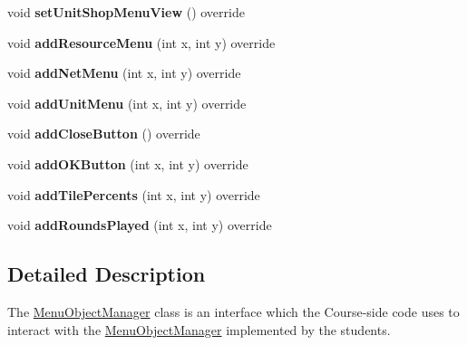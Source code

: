 \begin{DoxyCompactItemize}
\item 
\hypertarget{class_student_1_1_menu_object_manager_ae8347dca587be960c557aa66fada1ea8}{void {\bfseries set\-Unit\-Shop\-Menu\-View} () override}\label{class_student_1_1_menu_object_manager_ae8347dca587be960c557aa66fada1ea8}

\item 
\hypertarget{class_student_1_1_menu_object_manager_a5679ccf375ca620ce923a50ed22deff4}{void {\bfseries add\-Resource\-Menu} (int x, int y) override}\label{class_student_1_1_menu_object_manager_a5679ccf375ca620ce923a50ed22deff4}

\item 
\hypertarget{class_student_1_1_menu_object_manager_ab57240c9624c859f44e9ac26fc840e80}{void {\bfseries add\-Net\-Menu} (int x, int y) override}\label{class_student_1_1_menu_object_manager_ab57240c9624c859f44e9ac26fc840e80}

\item 
\hypertarget{class_student_1_1_menu_object_manager_a84200941f70167e2ef288253835e8439}{void {\bfseries add\-Unit\-Menu} (int x, int y) override}\label{class_student_1_1_menu_object_manager_a84200941f70167e2ef288253835e8439}

\item 
\hypertarget{class_student_1_1_menu_object_manager_aa1fbe2e11b3288a49f3a302895e5da2d}{void {\bfseries add\-Close\-Button} () override}\label{class_student_1_1_menu_object_manager_aa1fbe2e11b3288a49f3a302895e5da2d}

\item 
\hypertarget{class_student_1_1_menu_object_manager_a9a4761e16ac5fecf3bde7c333820277c}{void {\bfseries add\-O\-K\-Button} (int x, int y) override}\label{class_student_1_1_menu_object_manager_a9a4761e16ac5fecf3bde7c333820277c}

\item 
\hypertarget{class_student_1_1_menu_object_manager_a848281436bedffd732ae306911ad07d3}{void {\bfseries add\-Tile\-Percents} (int x, int y) override}\label{class_student_1_1_menu_object_manager_a848281436bedffd732ae306911ad07d3}

\item 
\hypertarget{class_student_1_1_menu_object_manager_aebd7e45513e4f04b278e3729c6b5ac3c}{void {\bfseries add\-Rounds\-Played} (int x, int y) override}\label{class_student_1_1_menu_object_manager_aebd7e45513e4f04b278e3729c6b5ac3c}

\end{DoxyCompactItemize}


\subsection{Detailed Description}
The \hyperlink{class_student_1_1_menu_object_manager}{Menu\-Object\-Manager} class is an interface which the Course-\/side code uses to interact with the \hyperlink{class_student_1_1_menu_object_manager}{Menu\-Object\-Manager} implemented by the students. 

